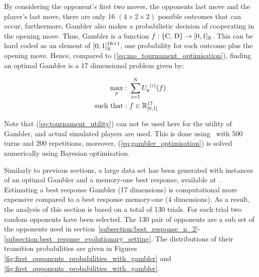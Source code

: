 By considering the opponent's first two moves, the opponents last move and the
player's last move, there are only 16 $(4 \times 2 \times 2)$ possible outcomes
that can occur, furthermore, Gambler also makes a probabilistic decision of
cooperating in the opening move. Thus, Gambler is a function \(f: \{\text{C,
D}\} \rightarrow [0, 1]_{\mathbb{R}}\). This can be hard coded as an element
of \([0, 1]_{\mathbb{R}} ^ {16 + 1}\), one probability for each outcome plus the opening
move. Hence, compared to (\ref{eq:mo_tournament_optimisation}), finding an
optimal Gambler is a 17 dimensional problem given by:

\begin{equation}\label{eq:gambler_optimisation}
    \begin{aligned}
    \max_p: & \ \sum_{i=1} ^ {N} {U_q}^{(i)} (f)
    \\
    \text{such that}: & \ f \in \mathbb{R}_{[0, 1]}^{17}
    \end{aligned}
\end{equation}

Note that (\ref{eq:tournament_utility}) can not be used here for the utility
of Gambler, and actual simulated players are used. This is done using~\cite{axelrodproject}
with 500 turns and 200 repetitions, moreover, (\ref{eq:gambler_optimisation})
is solved numerically using Bayesian optimisation.

Similarly to previous sections, a large data set has been generated with
instances of an optimal Gambler and a memory-one best response, available
at~\cite{glynatsi2019}. Estimating a best response Gambler (17 dimensions) is
computational more expensive compared to a best response memory-one (4
dimensions). As a result, the analysis of this section is based on a total of
130 trials. For each trial two random opponents have been selected. The 130 pair
of opponents are a sub set of the opponents used in
section~\ref{subsection:best_response_n_2}-
\ref{subsection:best_respnse_evolutionary_setting}. The distributions of their
transition probabilities are given in Figures
\ref{fig:first_opponents_probabilities_with_gambler} and
\ref{fig:first_opponents_probabilities_with_gambler}.

